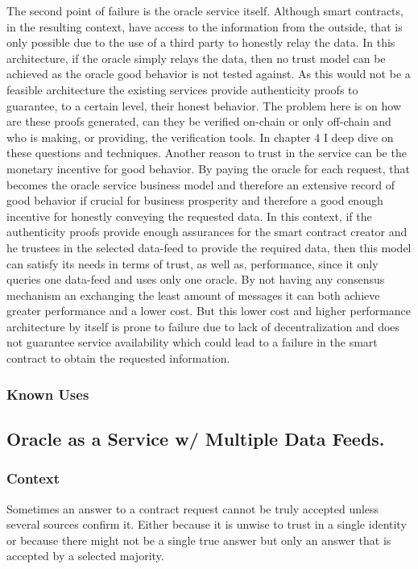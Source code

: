 The second point of failure is the oracle service itself. Although smart contracts, in the resulting context, have access to the information from the outside, that is only possible due to the use of a third party to honestly relay the data. In this architecture, if the oracle simply relays the data, then no trust model can be achieved as the oracle good behavior is not tested against. As this would not be a feasible architecture the existing services provide authenticity proofs to guarantee, to a certain level, their honest behavior. The problem here is on how are these proofs generated, can they be verified on-chain or only off-chain and who is making, or providing, the verification tools. In chapter 4 I deep dive on these questions and techniques. Another reason to trust in the service can be the monetary incentive for good behavior. By paying the oracle for each request, that becomes the oracle service business model and therefore an extensive record of good behavior if crucial for business prosperity and therefore a good enough incentive for honestly conveying the requested data.
In this context, if the authenticity proofs provide enough assurances for the smart contract creator and he trustees in the selected data-feed to provide the required data, then this model can satisfy its needs in terms of trust, as well as, performance, since it only queries one data-feed and uses only one oracle. By not having any consensus mechanism an exchanging the least amount of messages it can both achieve greater performance and a lower cost. But this lower cost and higher performance architecture by itself  is prone to failure due to lack of decentralization and does not guarantee service availability which could lead to a failure in the smart contract to obtain the requested information.



\subsubsection{Known Uses}


\subsection{Oracle as a Service w/ Multiple Data Feeds.}

\subsubsection{Context}
Sometimes an answer to a contract request cannot be truly accepted unless several sources confirm it. Either because it is unwise to trust in a single identity or because there might not be a single true answer but only an answer that is accepted by a selected majority.

